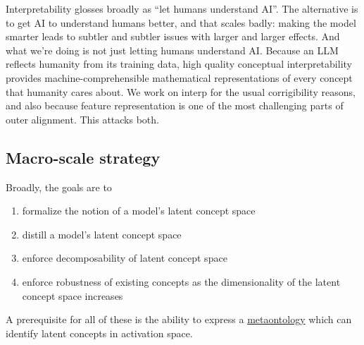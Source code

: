 Interpretability glosses broadly as ``let humans understand AI''. The
alternative is to get AI to understand humans better, and that scales
badly: making the model smarter leads to subtler and subtler issues
with larger and larger effects. And what we're doing is not just
letting humans understand AI. Because an LLM reflects humanity from its
training data, high quality conceptual interpretability provides
machine-comprehensible mathematical representations of every concept
that humanity cares about. We work on interp for the usual
corrigibility reasons, and also because feature representation is one
of the most challenging parts of outer alignment. This attacks both.

\subsection{Macro-scale strategy}
Broadly, the goals are to
\begin{enumerate}
  \item formalize the notion of a model's latent concept space
  \item distill a model's latent concept space
  \item enforce decomposability of latent concept space
  \item enforce robustness of existing concepts as the dimensionality of
  the latent concept space increases
\end{enumerate}
A prerequisite for all of these is the ability to express a
\href{https://plato.stanford.edu/entries/ontological-commitment/}{metaontology}
which can identify latent concepts in activation space.


